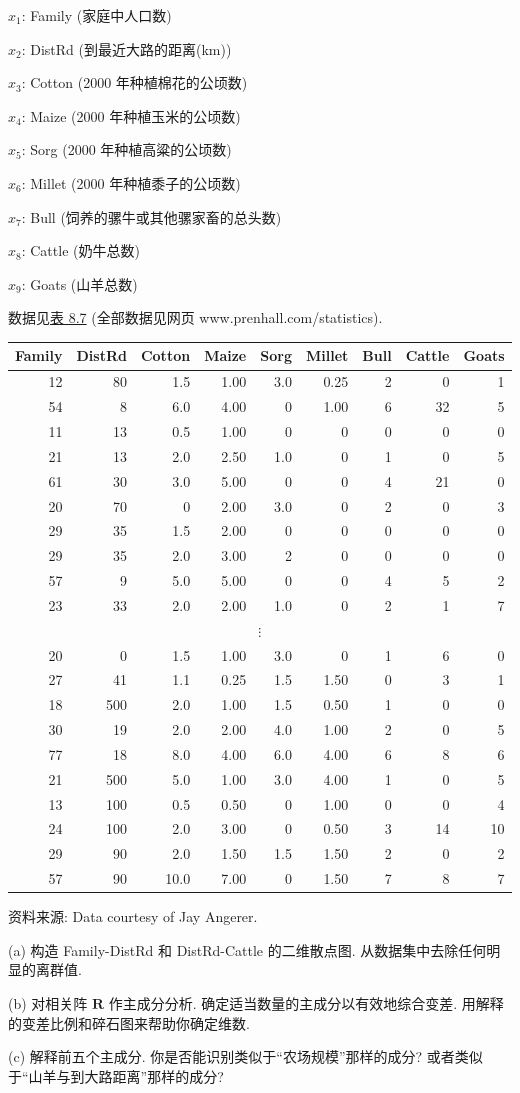 
$x_1$: Family (家庭中人口数)

$x_2$: DistRd (到最近大路的距离(km))

$x_3$: Cotton (2000 年种植棉花的公顷数)

$x_4$: Maize (2000 年种植玉米的公顷数)

$x_5$: Sorg (2000 年种植高粱的公顷数)

$x_6$: Millet (2000 年种植黍子的公顷数)

$x_7$: Bull (饲养的骡牛或其他骡家畜的总头数)

$x_8$: Cattle (奶牛总数)

$x_9$: Goats (山羊总数)

数据见\hyperref[tab:8.7]{表 8.7} (全部数据见网页 www.prenhall.com/statistics).

\begin{mvtable}
\label{tab:8.7}
\begin{tabular}{rrrrrrrrr}
\toprule
Family & DistRd & Cotton & Maize & Sorg & Millet & Bull & Cattle & Goats\\
\midrule
12&80&1.5&1.00&3.0&0.25&2&0&1\\
54&8&6.0&4.00&0&1.00&6&32&5\\
11&13&0.5&1.00&0&0&0&0&0\\
21&13&2.0&2.50&1.0&0&1&0&5\\
61&30&3.0&5.00&0&0&4&21&0\\
20&70&0&2.00&3.0&0&2&0&3\\
29&35&1.5&2.00&0&0&0&0&0\\
29&35&2.0&3.00&2&0&0&0&0\\
57&9&5.0&5.00&0&0&4&5&2\\
23&33&2.0&2.00&1.0&0&2&1&7\\
\multicolumn{9}{c}{$\vdots$}\\
20&0&1.5&1.00&3.0&0&1&6&0\\
27&41&1.1&0.25&1.5&1.50&0&3&1\\
18&500&2.0&1.00&1.5&0.50&1&0&0\\
30&19&2.0&2.00&4.0&1.00&2&0&5\\
77&18&8.0&4.00&6.0&4.00&6&8&6\\
21&500&5.0&1.00&3.0&4.00&1&0&5\\
13&100&0.5&0.50&0&1.00&0&0&4\\
24&100&2.0&3.00&0&0.50&3&14&10\\
29&90&2.0&1.50&1.5&1.50&2&0&2\\
57&90&10.0&7.00&0&1.50&7&8&7\\
\bottomrule
\end{tabular}

{\footnotesize 资料来源: Data courtesy of Jay Angerer.}
\end{mvtable}

(a) 构造 Family-DistRd 和 DistRd-Cattle 的二维散点图. 从数据集中去除任何明显的离群值.

(b) 对相关阵 $\mathbf{R}$ 作主成分分析. 确定适当数量的主成分以有效地综合变差. 用解释的变差比例和碎石图来帮助你确定维数.

(c) 解释前五个主成分. 你是否能识别类似于“农场规模”那样的成分? 或者类似于“山羊与到大路距离”那样的成分?
